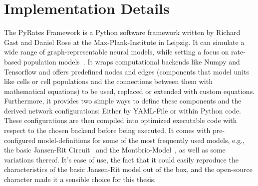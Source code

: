
\section{Implementation Details}\label{sec:pyrates-framework}

The PyRates Framework is a Python software framework written by Richard Gast and Daniel Rose at
the Max-Plank-Institute in Leipzig.
It can simulate a wide range of graph-representable neural models,
while setting a focus on rate-based population models~\cite{gast_pyratespython_2019}.
It wraps computational backends like Numpy and Tensorflow and offers predefined nodes and
edges (components that model units like cells or cell populations and the
connections between them with mathematical equations) to be used,
replaced or extended with custom equations.
Furthermore, it provides two simple ways to define these components and the derived network configurations:
Either by YAML-File or within Python code.
These configurations are then compiled into optimized executable code with respect to
the chosen backend before being executed.
It comes with pre-configured model-definitions for some of the most frequently used models, e.g., the basic
Jansen-Rit Circuit~\cite{jansen_electroencephalogram_1995} and the
Montbrio-Model~\cite{montbrio_macroscopic_2015}, as well as some variations thereof.
It's ease of use, the fact that it could easily reproduce the characteristics of
the basic Jansen-Rit model out of the box,
and the open-source character made it a sensible choice for this thesis.
%
%
%
%
%
%
%

